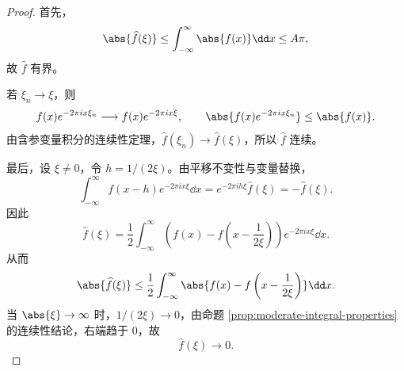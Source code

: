 \begin{proof}
	首先，
	\[
	\abs{\widehat f(\xi)}
	\leq\int_{-\infty}^{\infty}\abs{f(x)}\dd x
	\leq A\pi,
	\]
	故 $\widehat f$ 有界。
	
	若 $\xi_n\to\xi$，则
	\[
	f(x)e^{-2\pi i x\xi_n}\longrightarrow f(x)e^{-2\pi i x\xi},
	\qquad
	\abs{f(x)e^{-2\pi i x\xi_n}}\leq\abs{f(x)}.
	\]
	由含参变量积分的连续性定理，$\widehat f(\xi_n)\to\widehat f(\xi)$，所以 $\widehat f$ 连续。
	
	最后，设 $\xi\neq0$，令 $h=1/(2\xi)$。由平移不变性与变量替换，
	\[
	\int_{-\infty}^{\infty}f(x-h)e^{-2\pi i x\xi}\dd x
	=e^{-2\pi i h\xi}\widehat f(\xi)
	=-\widehat f(\xi).
	\]
	因此
	\[
	\widehat f(\xi)
	=\frac12\int_{-\infty}^{\infty}
	\left(f(x)-f\left(x-\frac1{2\xi}\right)\right)e^{-2\pi i x\xi}\dd x.
	\]
	从而
	\[
	\abs{\widehat f(\xi)}
	\leq\frac12\int_{-\infty}^{\infty}
	\abs{f(x)-f\left(x-\frac1{2\xi}\right)}\dd x.
	\]
	当 $\abs{\xi}\to\infty$ 时，$1/(2\xi)\to0$，由命题 \ref{prop:moderate-integral-properties} 的连续性结论，右端趋于 $0$，故
	\[
	\widehat f(\xi)\longrightarrow0.
	\]
\end{proof}
